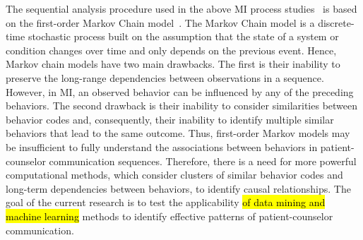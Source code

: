 The sequential analysis procedure used in the above MI process studies~\cite{moyers2006therapist, catley2006adherence, thrasher2006motivational, mccambridge2011fidelity} is based on the first-order Markov Chain model~\cite{moyers2006therapist, moyers2009session, gaume2010counselor}. The Markov Chain model is a discrete-time stochastic process built on the assumption that the state of a system or condition changes over time and only depends on the previous event. Hence, Markov chain models have two main drawbacks. The first is their inability to preserve the long-range dependencies between observations in a sequence. However, in MI, an observed behavior can be influenced by any of the preceding behaviors. The second drawback is their inability to consider similarities between behavior codes and, consequently, their inability to identify multiple similar behaviors that lead to the same outcome. Thus, first-order Markov models may be insufficient to fully understand the associations between behaviors in patient-counselor communication sequences. Therefore, there is a need for more powerful computational methods, which consider clusters of similar behavior codes and long-term dependencies between behaviors, to identify causal relationships. The goal of the current research is to test the applicability \hl{of data mining and machine learning} methods to identify effective patterns of patient-counselor communication.

